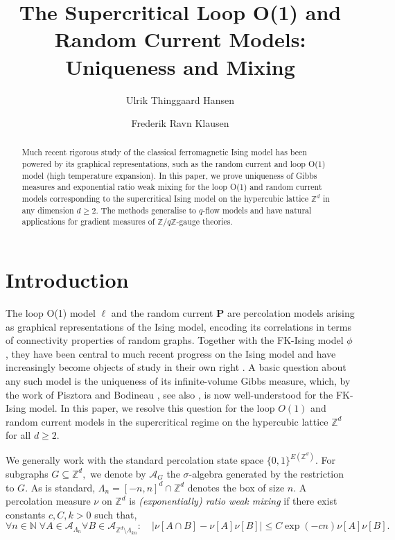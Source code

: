 \documentclass[article,11pt,reqno]{amsart}
\author{Ulrik Thinggaard Hansen}
\author{Frederik Ravn Klausen}
\title{The Supercritical Loop O(1) and Random Current Models: Uniqueness and Mixing}
\newcommand{\Z}{\mathbb{Z}}
\newcommand{\Prbcur}{\mathbf{P}}
\begin{document}
\begin{abstract}
Much recent rigorous study of the classical ferromagnetic Ising model has been powered by its graphical representations, such as the random current and loop O(1) model (high temperature expansion).
In this paper, we prove uniqueness of Gibbs measures and exponential ratio weak mixing for the loop O(1) and random current models corresponding to the supercritical Ising model on the hypercubic lattice $\mathbb{Z}^d$ in any dimension $d \geq 2$. 
The methods generalise to $q$-flow models and have natural applications for gradient measures of $\mathbb{Z}/q\mathbb{Z}$-gauge theories. 
\end{abstract}


\vspace{-1cm}
\maketitle
\vspace{-0.5cm}



\section{Introduction}
The loop O(1) model $\ell$ and the random current $\Prbcur$ are percolation models arising as graphical representations of the Ising model, encoding its correlations in terms of connectivity properties of random graphs. Together with the FK-Ising model $\phi$, they have been central to much recent progress on the Ising model \cite{aizenman2021marginal} and have increasingly become objects of study in their own right \cite{ Gri06}. A basic question about any such model is the uniqueness of its infinite-volume Gibbs measure, which, by the work of Pisztora \cite{Pis96} and Bodineau \cite{bodineau2006translation}, see also \cite{raoufi2020translation}, is now well-understood for the FK-Ising model.  In this paper, we resolve this question for the loop $O(1)$ and random current models in the supercritical regime on the hypercubic lattice $\Z^d$ for all $d\geq2$.


We generally work with the standard percolation state space $\{0,1\}^{E(\mathbb{Z}^d)}$. For subgraphs $G\subseteq \mathbb{Z}^d,$ we denote by $\mathcal{A}_G$ the $\sigma$-algebra generated by the restriction to $G$. As is standard, $\Lambda_n=[-n,n]^d\cap \mathbb{Z}^d$ denotes the box of size $n$.
A percolation measure $\nu$ on $\mathbb{Z}^d$ is \emph{(exponentially) ratio weak mixing} if there exist constants $c,C,k>0$ such that, 
\begin{equation}\label{eq:RWM}
\forall n\in \mathbb{N}\; \forall A\in \mathcal{A}_{\Lambda_n}\forall B\in \mathcal{A}_{\mathbb{Z}^d\setminus \Lambda_{kn}}:\quad |\nu[A\cap B]-\nu[A]\nu[B]|\leq C\exp(-c n) \nu[A]\nu[B]. \tag{RWM}
\end{equation}
\end{document}
